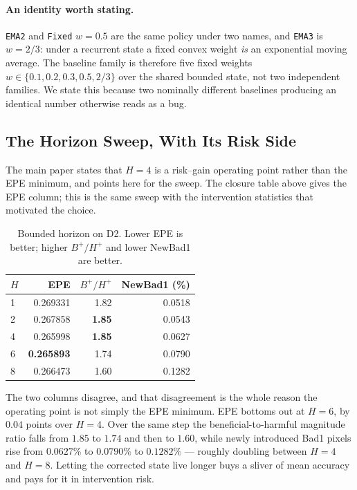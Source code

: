 \documentclass[letterpaper,10pt,conference]{ieeeconf}
\begin{document}
\paragraph{An identity worth stating.}
\texttt{EMA2} and \texttt{Fixed} $w=0.5$ are the same policy under two
names, and \texttt{EMA3} is $w=2/3$: under a recurrent state a fixed
convex weight \emph{is} an exponential moving average. The baseline
family is therefore five fixed weights
$w\in\{0.1,0.2,0.3,0.5,2/3\}$ over the shared bounded state, not two
independent families. We state this because two nominally different
baselines producing an identical number otherwise reads as a bug.

\subsection*{The Horizon Sweep, With Its Risk Side}

The main paper states that $H=4$ is a risk--gain operating point rather
than the EPE minimum, and points here for the sweep. The closure table
above gives the EPE column; this is the same sweep with the intervention
statistics that motivated the choice.

\begin{table}[!ht]
\centering
\footnotesize
\caption{Bounded horizon on D2. Lower EPE is better; higher $B^+/H^+$ and
lower NewBad1 are better.}
\label{sup:horizons}
\begin{tabular}{@{}lrrr@{}}
\toprule
$H$ & EPE & $B^+/H^+$ & NewBad1 (\%) \\
\midrule
1 & 0.269331 & 1.82 & 0.0518 \\
2 & 0.267858 & \textbf{1.85} & 0.0543 \\
4 & 0.265998 & \textbf{1.85} & 0.0627 \\
6 & \textbf{0.265893} & 1.74 & 0.0790 \\
8 & 0.266473 & 1.60 & 0.1282 \\
\bottomrule
\end{tabular}
\end{table}

The two columns disagree, and that disagreement is the whole reason the
operating point is not simply the EPE minimum. EPE bottoms out at $H=6$,
by $0.04$ points over $H=4$. Over the same step the beneficial-to-harmful
magnitude ratio falls from $1.85$ to $1.74$ and then to $1.60$, while
newly introduced Bad1 pixels rise from $0.0627\%$ to $0.0790\%$ to
$0.1282\%$ --- roughly doubling between $H=4$ and $H=8$. Letting the
corrected state live longer buys a sliver of mean accuracy and pays for
it in intervention risk.
\end{document}
